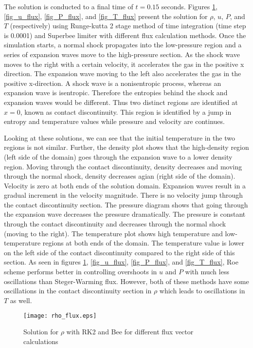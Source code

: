 \documentclass{article}
\begin{document}
The solution is conducted to a final time of $t=0.15$ seconds. Figures \ref{fig_rho_flux}, \ref{fig_u_flux}, \ref{fig_P_flux}, and \ref{fig_T_flux} present the solution for $\rho$, $u$, $P$, and $T$ (respectively) using Runge-kutta 2 stage method of time integration (time step is 0.0001) and Superbee limiter with different flux calculation methods. Once the simulation starts, a normal shock propagates into the low-pressure region and a series of expansion waves move to the high-pressure section. As the shock wave moves to the right with a certain velocity, it accelerates the gas in the positive x direction. The expansion wave moving to the left also accelerates the gas in the positive x-direction. A shock wave is a nonisentropic process, whereas an expansion wave is isentropic. Therefore the entropies behind the shock and expansion waves would be different. Thus two distinct regions are identified at $x=0$, known as contact discontinuity. This region is identified by a jump in entropy and temperature values while pressure and velocity are continues.

Looking at these solutions, we can see that the initial temperature in the two regions is not similar. Further, the density plot shows that the high-density region (left side of the domain) goes through the expansion wave to a lower density region. Moving through the contact discontinuity, density decreases and moving through the normal shock, density decreases agian (right side of the domain). Velocity is zero at both ends of the solution domain. Expansion waves result in a gradual increment in the velocity magnitude. There is no velocity jump through the contact discontinuity section. The pressure diagram shows that going through the expansion wave decreases the pressure dramatically. The pressure is constant through the contact discontinuity and decreases through the normal shock (moving to the right). The temperature plot shows high temperature and low-temperature regions at both ends of the domain. The temperature value is lower on the left side of the contact discontinuity compared to the right side of this section. As seen in figures \ref{fig_rho_flux}, \ref{fig_u_flux}, \ref{fig_P_flux}, and \ref{fig_T_flux}, Roe scheme performs better in controlling overshoots in $u$ and $P$ with much less oscillations than Steger-Warming flux. However, both of these methods have some oscillations in the contact discontinuity section in $\rho$ which leads to oscillations in $T$ as well.

\begin{figure}[H]
\centering
\texttt{[image: rho\_flux.eps]}
\caption{Solution for $\rho$ with RK2 and Bee for different flux vector calculations}
\label{fig_rho_flux}
\end{figure}
\end{document}
